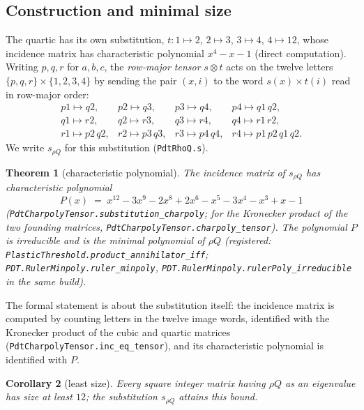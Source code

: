 \documentclass[11pt]{amsart}
\theoremstyle{plain}
\newtheorem{theorem}{Theorem}[section]
\newtheorem{corollary}[theorem]{Corollary}
\theoremstyle{definition}
\theoremstyle{remark}
\begin{document}
\subsection{Construction and minimal size}

The quartic has its own substitution, $t \colon 1 \mapsto 2$, $2 \mapsto 3$, $3 \mapsto 4$,
$4 \mapsto 12$, whose incidence matrix has characteristic polynomial $x^4 - x - 1$ (direct
computation). Writing $p, q, r$ for $a, b, c$, the \emph{row-major tensor} $s \otimes t$ acts on
the twelve letters $\{p, q, r\} \times \{1, 2, 3, 4\}$ by sending the pair $(x, i)$ to the
word $s(x) \times t(i)$ read in row-major order:
\[
\begin{array}{llll}
p1 \mapsto q2, & p2 \mapsto q3, & p3 \mapsto q4, & p4 \mapsto q1\,q2, \\
q1 \mapsto r2, & q2 \mapsto r3, & q3 \mapsto r4, & q4 \mapsto r1\,r2, \\
r1 \mapsto p2\,q2, & r2 \mapsto p3\,q3, & r3 \mapsto p4\,q4, & r4 \mapsto p1\,p2\,q1\,q2 .
\end{array}
\]
We write $s_{\rho Q}$ for this substitution (\texttt{PdtRhoQ.s}).

\begin{theorem}[characteristic polynomial]\label{thm:rhoQcharpoly}
The incidence matrix of $s_{\rho Q}$ has characteristic polynomial
\[
  P(x) \;=\; x^{12} - 3x^{9} - 2x^{8} + 2x^{6} - x^{5} - 3x^{4} - x^{3} + x - 1
\]
\textup{(\texttt{PdtCharpolyTensor.substitution\_charpoly}; for the Kronecker product of the
two founding matrices, \texttt{PdtCharpolyTensor.charpoly\_tensor})}. The polynomial $P$ is
irreducible and is the minimal polynomial of $\rho Q$ \textup{(registered:
\texttt{PlasticThreshold.product\_annihilator\_iff}; \texttt{PDT.RulerMinpoly.ruler\_minpoly},
\texttt{PDT.RulerMinpoly.rulerPoly\_irreducible} in the same build)}.
\end{theorem}

The formal statement is about the substitution itself: the incidence matrix is computed by
counting letters in the twelve image words, identified with the Kronecker product of the
cubic and quartic matrices (\texttt{PdtCharpolyTensor.inc\_eq\_tensor}), and its
characteristic polynomial is identified with $P$.

\begin{corollary}[least size]\label{cor:leastsize}
Every square integer matrix having $\rho Q$ as an eigenvalue has size at least $12$; the
substitution $s_{\rho Q}$ attains this bound.
\end{corollary}
\end{document}

